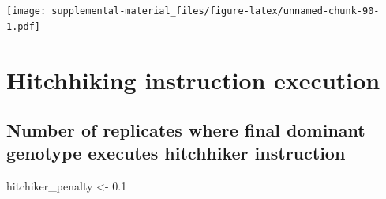 \documentclass[]{book}
\newenvironment{Shaded}{\begin{snugshade}}{\end{snugshade}}
\newcommand{\FloatTok}[1]{\textcolor[rgb]{0.00,0.00,0.81}{#1}}
\newcommand{\NormalTok}[1]{#1}
\newcommand{\StringTok}[1]{\textcolor[rgb]{0.31,0.60,0.02}{#1}}
\begin{document}
\texttt{[image: supplemental-material\_files/figure-latex/unnamed-chunk-90-1.pdf]}

\hypertarget{hitchhiking-instruction-execution}{%
\section{Hitchhiking instruction execution}\label{hitchhiking-instruction-execution}}

\hypertarget{number-of-replicates-where-final-dominant-genotype-executes-hitchhiker-instruction}{%
\subsection{Number of replicates where final dominant genotype executes hitchhiker instruction}\label{number-of-replicates-where-final-dominant-genotype-executes-hitchhiker-instruction}}

\begin{Shaded}
\begin{Highlighting}[]
\NormalTok{hitchiker_penalty <-}\StringTok{ }\FloatTok{0.1}
\end{Highlighting}
\end{Shaded}
\end{document}
